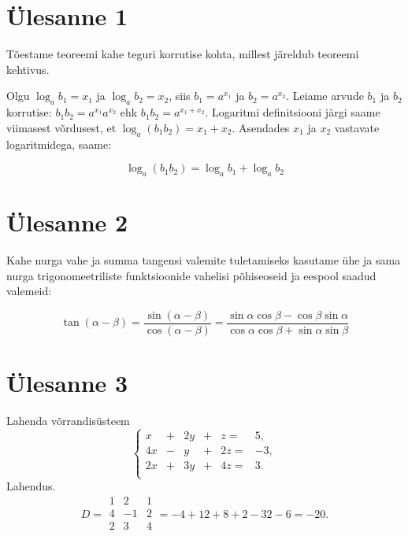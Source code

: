 \section{Ülesanne 1} 

\par
Tõestame teoreemi kahe teguri korrutise kohta, millest järeldub teoreemi kehtivus.
\par
Olgu $\log_a b_1 = x_1$ ja $\log_a b_2 = x_2$, siis $b_1 = a^{x_1}$ ja $b_2 = a^{x_2}$. Leiame arvude $b_1$ ja $b_2$ korrutise: $b_1 b_2 = a^{x_1} a^{x_2}$ ehk $b_1 b_2 = a^{x_1 + x_2}$. Logaritmi definitsiooni järgi saame viimasest võrdusest, et $\log_a(b_1 b_2) = x_1 + x_2$. Asendades $x_1$ ja $x_2$ vastavate logaritmidega, saame:

\begin{equation}
	\log_a(b_1 b_2) = \log_a b_1 + \log_a b_2
\end{equation}

\section{Ülesanne 2}

Kahe nurga vahe ja summa tangensi valemite tuletamiseks kasutame ühe ja sama nurga trigonomeetriliste funktsioonide vahelisi põhiseoseid ja eespool saadud valemeid:

\begin{equation}
	\tan(\alpha	- \beta)
		= \frac{\sin(\alpha	- \beta)}{\cos(\alpha	- \beta)}
		= \frac{\sin\alpha\cos\beta - \cos\beta\sin\alpha}
					 {\cos\alpha\cos\beta + \sin\alpha\sin\beta}
\end{equation}

\section{Ülesanne 3}

Lahenda võrrandisüsteem
\begin{equation}
  \left\{ 
  \begin{array}{*{7}{r}}
    x  & + & 2y & + &  z = &  5, \\
    4x & - &  y & + & 2z = & -3, \\
    2x & + & 3y & + & 4z = &  3. \\
  \end{array}
\end{equation}
Lahendus.
\begin{equation}
	D = 
	\begin{array}{|*{3}{r}|}
	1 & 2 & 1 \\
	4 & -1 & 2 \\
	2 & 3 & 4 \\
	\end{array}
	= -4 +12 +8 +2 -32 -6 = -20.
\end{equation}
